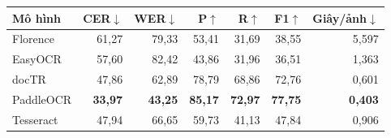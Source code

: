 \begin{tabular*}{\linewidth}{@{\extracolsep{\fill}}lrrrrrr@{}}
\toprule
\textbf{Mô hình} & \textbf{CER}$\downarrow$ & \textbf{WER}$\downarrow$ &
\textbf{P}$\uparrow$ & \textbf{R}$\uparrow$ & \textbf{F1}$\uparrow$ & \textbf{Giây/ảnh}$\downarrow$ \\
\midrule
Florence & 61,27 & 79,33 & 53,41 & 31,69 & 38,55 & 5,597 \\
EasyOCR & 57,60 & 82,42 & 43,86 & 31,96 & 36,51 & 1,363 \\
docTR & 47,86 & 62,89 & 78,79 & 68,86 & 72,76 & 0,601 \\
PaddleOCR & \textbf{33,97} & \textbf{43,25} & \textbf{85,17} & \textbf{72,97} & \textbf{77,75} & \textbf{0,403} \\
Tesseract & 47,94 & 66,65 & 59,73 & 41,13 & 47,84 & 0,906 \\
\bottomrule
\end{tabular*}
